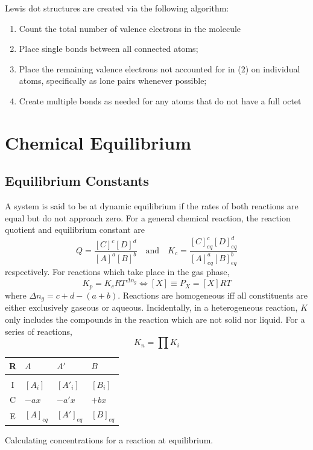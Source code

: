 \documentclass{tufte-book}
\begin{document}
Lewis dot structures are created via the following algorithm: \begin{enumerate}
  \item Count the total number of valence electrons in the molecule
  \item Place single bonds between all connected atoms;
  \item Place the remaining valence electrons not accounted for in (2) on individual atoms, specifically as lone pairs whenever possible;
  \item Create multiple bonds as needed for any atoms that do not have a full octet
\end{enumerate}

\chapter{Chemical Equilibrium}

\section{Equilibrium Constants}

A system is said to be at dynamic equilibrium if the rates of both reactions are equal but do not approach zero. For a general chemical reaction, the reaction quotient and equilibrium constant are
\begin{equation}
  Q = \frac{[C]^c [D]^d}{[A]^a [B]^b} \quad\text{and}\quad K_c = \frac{[C]^c_{eq} [D]^d_{eq}}{[A]^a_{eq} [B]^b_{eq}}
\end{equation}
respectively. For reactions which take place in the gas phase, \begin{equation}
  K_p = K_c RT^{\Delta n_g} \iff [X] \equiv P_X = [X]RT
\end{equation}
where $\Delta n_g = c+d-(a+b)$. Reactions are homogeneous iff all constituents are either exclusively gaseous or aqueous. Incidentally, in a heterogeneous reaction, $K$ only includes the compounds in the reaction which are not solid nor liquid. For a series of reactions, \begin{equation}
  K_n = \prod K_i
\end{equation}


\begin{marginfigure}
  \begin{center}
    \setlength{\tabcolsep}{7pt}
    \renewcommand{\arraystretch}{1.6}
    \begingroup
    \begin{tabular}{clll}
      R & $A$ & $A'$ & $B$ \\[1mm]
      \hline \\[-5mm]
      I & $[A_i]$ & $[A'_i]$ & $[B_i]$ \\
      C & $-ax$ & $-a'x$ &  $+bx$ \\
      E & $[A]_{eq}$ & $[A']_{eq}$ & $[B]_{eq}$
    \end{tabular}
    \endgroup \phantom{m}
  \end{center}
  \caption[]{Calculating concentrations for a reaction at equilibrium.}
\end{marginfigure}
\end{document}
